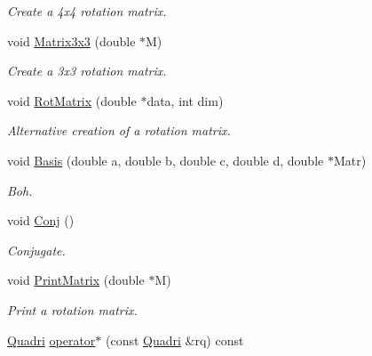 \begin{DoxyCompactItemize}
\begin{DoxyCompactList}\small\item\em \-Create a 4x4 rotation matrix. \end{DoxyCompactList}\item 
\hypertarget{classQuadri_a74ee4f939f9baca1794ff7edb745cfaf}{void \hyperlink{classQuadri_a74ee4f939f9baca1794ff7edb745cfaf}{\-Matrix3x3} (double $\ast$\-M)}\label{classQuadri_a74ee4f939f9baca1794ff7edb745cfaf}

\begin{DoxyCompactList}\small\item\em \-Create a 3x3 rotation matrix. \end{DoxyCompactList}\item 
\hypertarget{classQuadri_ac6d5ee6f07fd55cda03804e371fbc6db}{void \hyperlink{classQuadri_ac6d5ee6f07fd55cda03804e371fbc6db}{\-Rot\-Matrix} (double $\ast$data, int dim)}\label{classQuadri_ac6d5ee6f07fd55cda03804e371fbc6db}

\begin{DoxyCompactList}\small\item\em \-Alternative creation of a rotation matrix. \end{DoxyCompactList}\item 
\hypertarget{classQuadri_a3b43a59660a1323f96a27abfa01d14c1}{void \hyperlink{classQuadri_a3b43a59660a1323f96a27abfa01d14c1}{\-Basis} (double a, double b, double c, double d, double $\ast$\-Matr)}\label{classQuadri_a3b43a59660a1323f96a27abfa01d14c1}

\begin{DoxyCompactList}\small\item\em \-Boh. \end{DoxyCompactList}\item 
\hypertarget{classQuadri_a3a27690dd6fb11d4799dcce8f0410a07}{void \hyperlink{classQuadri_a3a27690dd6fb11d4799dcce8f0410a07}{\-Conj} ()}\label{classQuadri_a3a27690dd6fb11d4799dcce8f0410a07}

\begin{DoxyCompactList}\small\item\em \-Conjugate. \end{DoxyCompactList}\item 
\hypertarget{classQuadri_aa859dc583567c5bcd931fa9b7ea85a67}{void \hyperlink{classQuadri_aa859dc583567c5bcd931fa9b7ea85a67}{\-Print\-Matrix} (double $\ast$\-M)}\label{classQuadri_aa859dc583567c5bcd931fa9b7ea85a67}

\begin{DoxyCompactList}\small\item\em \-Print a rotation matrix. \end{DoxyCompactList}\item 
\hypertarget{classQuadri_a5c3fd3fea1d46ac23e079d42af170d62}{\hyperlink{classQuadri}{\-Quadri} \hyperlink{classQuadri_a5c3fd3fea1d46ac23e079d42af170d62}{operator$\ast$} (const \hyperlink{classQuadri}{\-Quadri} \&rq) const }\label{classQuadri_a5c3fd3fea1d46ac23e079d42af170d62}


\end{DoxyCompactItemize}
